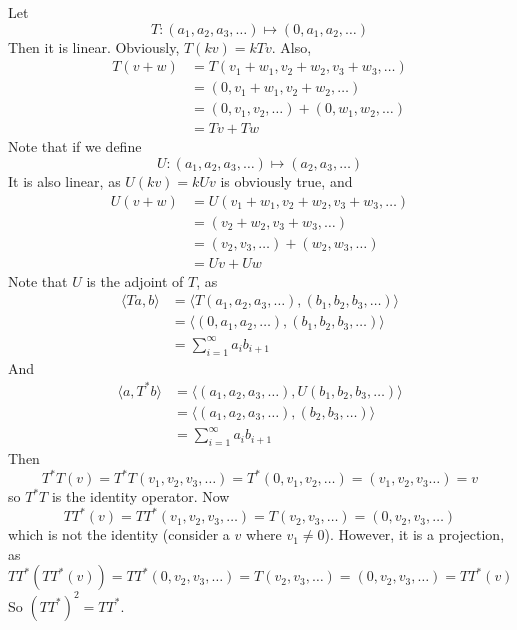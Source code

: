 \documentclass[answers]{exam}
\begin{document}
\begin{questions}
\begin{solution}
	Let 
	$$T: (a_1,a_2,a_3,\dots) \mapsto (0,a_1,a_2,\dots)$$
	Then it is linear. Obviously, $T(kv) = kTv$. Also,
	\begin{align*}
		T(v+w) &= T(v_1+w_1,v_2+w_2,v_3+w_3,\dots) \\
		       &= (0,v_1+w_1,v_2+w_2,\dots) \\
		       &= (0,v_1,v_2,\dots) + (0,w_1,w_2,\dots) \\
		       &= Tv + Tw
	\end{align*}
	Note that if we define
	$$U: (a_1,a_2,a_3,\dots) \mapsto (a_2,a_3,\dots)$$
	It is also linear, as $U(kv) = kUv$ is obviously true, and
	\begin{align*}
		U(v+w) &= U(v_1+w_1,v_2+w_2,v_3+w_3,\dots) \\
		       &= (v_2+w_2,v_3+w_3,\dots) \\
		       &= (v_2,v_3,\dots) + (w_2,w_3,\dots) \\
		       &= Uv + Uw
	\end{align*}
	Note that $U$ is the adjoint of $T$, as
	\begin{align*}
		\langle Ta,b \rangle &= \langle T(a_1,a_2,a_3,\dots),(b_1,b_2,b_3,\dots) \rangle \\
				     &= \langle (0,a_1,a_2,\dots),(b_1,b_2,b_3,\dots) \rangle \\
				     &= \sum_{i=1}^\infty a_ib_{i+1}
	\end{align*}
	And
	\begin{align*}
		\langle a,T^*b \rangle &= \langle (a_1,a_2,a_3,\dots),U(b_1,b_2,b_3,\dots) \rangle \\
				       &= \langle (a_1,a_2,a_3,\dots),(b_2,b_3,\dots) \rangle \\
				       &= \sum_{i=1}^\infty a_ib_{i+1}
	\end{align*}
	Then
	$$T^*T(v) = T^*T(v_1,v_2,v_3,\dots) = T^*(0,v_1,v_2,\dots) = (v_1,v_2,v_3\dots) = v$$
	so $T^*T$ is the identity operator. Now
	$$TT^*(v) = TT^*(v_1,v_2,v_3,\dots) = T(v_2,v_3,\dots) = (0,v_2,v_3,\dots)$$
	which is not the identity (consider a $v$ where $v_1 \neq 0$). However, it is a projection, as
	$$TT^*(TT^*(v)) = TT^*(0,v_2,v_3,\dots) = T(v_2,v_3,\dots) = (0,v_2,v_3,\dots) = TT^*(v)$$
	So $(TT^*)^2 = TT^*$.
\end{solution}


\end{questions}
\end{document}
